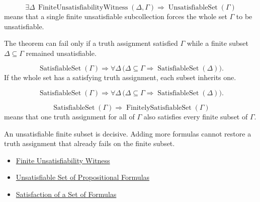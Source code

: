 \begin{remark*}
\[
\exists\Delta\,\operatorname{FiniteUnsatisfiabilityWitness}(\Delta,\Gamma)
\Rightarrow
\operatorname{UnsatisfiableSet}(\Gamma)
\]
means that a single finite unsatisfiable subcollection forces the whole set
\(\Gamma\) to be unsatisfiable.
\end{remark*}

\begin{remark*}
The theorem can fail only if a truth assignment satisfied \(\Gamma\) while a
finite subset \(\Delta\subseteq\Gamma\) remained unsatisfiable.
\end{remark*}

\begin{remark*}
\[
\operatorname{SatisfiableSet}(\Gamma)
\Rightarrow
\forall\Delta\,\bigl(\Delta\subseteq\Gamma\Rightarrow
\operatorname{SatisfiableSet}(\Delta)\bigr).
\]
If the whole set has a satisfying truth assignment, each subset inherits one.
\end{remark*}

\begin{remark*}
\[
\operatorname{SatisfiableSet}(\Gamma)
\Rightarrow
\forall\Delta\,\bigl(\Delta\subseteq\Gamma\Rightarrow
\operatorname{SatisfiableSet}(\Delta)\bigr).
\]
\end{remark*}

\begin{remark*}
\[
\operatorname{SatisfiableSet}(\Gamma)
\Rightarrow
\operatorname{FinitelySatisfiableSet}(\Gamma)
\]
means that one truth assignment for all of \(\Gamma\) also satisfies every
finite subset of \(\Gamma\).
\end{remark*}

\begin{remark*}[Interpretation]
An unsatisfiable finite subset is decisive. Adding more formulas cannot restore
a truth assignment that already fails on the finite subset.
\end{remark*}

\begin{dependencies}
\begin{itemize}
  \item \hyperref[def:finite-unsatisfiability-witness-propositional-logic]{Finite Unsatisfiability Witness}
  \item \hyperref[def:unsatisfiable-set-of-propositional-formulas]{Unsatisfiable Set of Propositional Formulas}
  \item \hyperref[def:satisfaction-set-propositional-logic]{Satisfaction of a Set of Formulas}
\end{itemize}
\end{dependencies}

